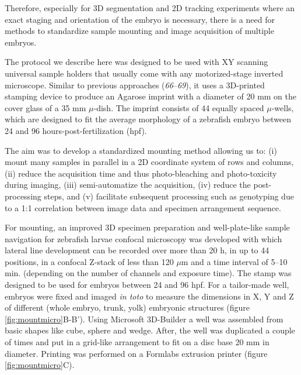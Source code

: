 \documentclass[10pt, b5paper, singlespacinge, twoside]{reedthesis} %
\theoremstyle{definition}
\theoremstyle{definition}
\theoremstyle{definition}
\theoremstyle{remark}
\begin{document}
Therefore, especially for 3D segmentation and 2D tracking experiments where an exact staging and orientation of the embryo is necessary, there is a need for methods to standardize sample mounting and image acquisition of multiple embryos.

The protocol we describe here was designed to be used with XY scanning universal sample holders that usually come with any motorized-stage inverted microscope. Similar to previous approaches (\emph{66}--\emph{69}), it uses a 3D-printed stamping device to produce an Agarose imprint with a diameter of 20 mm on the cover glass of a 35 mm \(\mu\)-dish. The imprint consists of 44 equally spaced \(\mu\)-wells, which are designed to fit the average morphology of a zebrafish embryo between 24 and 96 hours-post-fertilization (hpf).

The aim was to develop a standardized mounting method allowing us to: (i) mount many samples in parallel in a 2D coordinate system of rows and columns, (ii) reduce the acquisition time and thus photo-bleaching and photo-toxicity during imaging, (iii) semi-automatize the acquisition, (iv) reduce the post-processing steps, and (v) facilitate subsequent processing such as genotyping due to a 1:1 correlation between image data and specimen arrangement sequence.

For mounting, an improved 3D specimen preparation and well-plate-like sample navigation for zebrafish larvae confocal microscopy was developed with which lateral line development can be recorded over more than 20 h, in up to 44 positions, in a confocal Z-stack of less than 120 \(\mu\)m and a time interval of 5--10 min. (depending on the number of channels and exposure time). The stamp was designed to be used for embryos between 24 and 96 hpf. For a tailor-made well, embryos were fixed and imaged \emph{in toto} to measure the dimensions in X, Y and Z of different (whole embryo, trunk, yolk) embryonic structures (figure \ref{fig:mountmicro}B-B'). Using Microsoft 3D-Builder a well was assembled from basic shapes like cube, sphere and wedge. After, the well was duplicated a couple of times and put in a grid-like arrangement to fit on a disc base 20 mm in diameter. Printing was performed on a Formlabs extrusion printer (figure \ref{fig:mountmicro}C).
\end{document}
